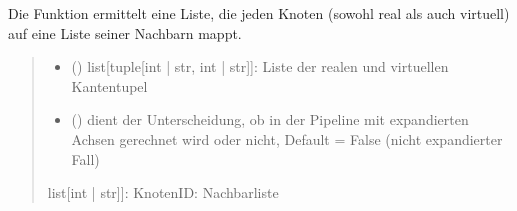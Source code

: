\documentclass[a4paper,10pt,ngerman]{sphinxmanual}
\begin{document}
\begin{fulllineitems}
\begin{fulllineitems}
\begin{quote}
\begin{description}
\sphinxAtStartPar
{}

\end{description}\end{quote}

\end{fulllineitems}


\begin{fulllineitems}
\label{\detokenize{api:src.hiveplot.HivePlotLayout.get_proper_neighborhood_map}}
\pysigstartsignatures
\pysiglinewithargsret
{}
{\sphinxparamcomma {}}
{}
\pysigstopsignatures
\sphinxAtStartPar
Die Funktion ermittelt eine Liste, die jeden Knoten (sowohl real als auch virtuell) auf eine Liste seiner Nachbarn mappt.
\begin{quote}\begin{description}
\begin{itemize}
\item {} 
\sphinxAtStartPar
{} () \textendash{} list{[}tuple{[}int | str, int | str{]}{]}: Liste der realen und virtuellen Kantentupel

\item {} 
\sphinxAtStartPar
{} () \textendash{} dient der Unterscheidung, ob in der Pipeline mit expandierten Achsen gerechnet wird oder nicht, Default = False (nicht expandierter Fall)

\end{itemize}

\sphinxAtStartPar
list{[}int | str{]}{]}: KnotenID: Nachbarliste


\end{description}
\end{quote}
\end{fulllineitems}
\end{fulllineitems}
\end{document}
